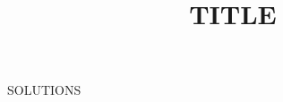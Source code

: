 \documentclass[12pt,letterpaper]{coursedoc}
\title{TITLE}
\begin{document}
\maketitle

\begin{description}
SOLUTIONS
\end{description}
\end{document}
